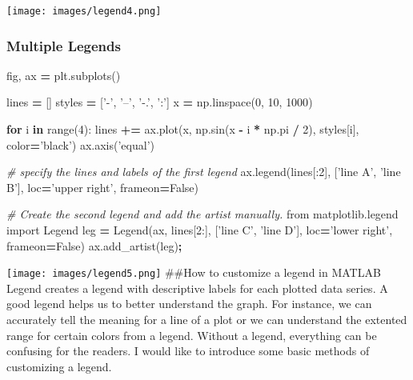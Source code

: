 \documentclass[]{book}
\newenvironment{Shaded}{\begin{snugshade}}{\end{snugshade}}
\newcommand{\BuiltInTok}[1]{#1}
\newcommand{\CommentTok}[1]{\textcolor[rgb]{0.56,0.35,0.01}{\textit{#1}}}
\newcommand{\ControlFlowTok}[1]{\textcolor[rgb]{0.13,0.29,0.53}{\textbf{#1}}}
\newcommand{\DecValTok}[1]{\textcolor[rgb]{0.00,0.00,0.81}{#1}}
\newcommand{\ImportTok}[1]{#1}
\newcommand{\KeywordTok}[1]{\textcolor[rgb]{0.13,0.29,0.53}{\textbf{#1}}}
\newcommand{\NormalTok}[1]{#1}
\newcommand{\OperatorTok}[1]{\textcolor[rgb]{0.81,0.36,0.00}{\textbf{#1}}}
\newcommand{\StringTok}[1]{\textcolor[rgb]{0.31,0.60,0.02}{#1}}
\newcommand{\VariableTok}[1]{\textcolor[rgb]{0.00,0.00,0.00}{#1}}
\begin{document}
\texttt{[image: images/legend4.png]}

\hypertarget{multiple-legends}{%
\subsubsection{Multiple Legends}\label{multiple-legends}}

\begin{Shaded}
\begin{Highlighting}[]
\NormalTok{fig, ax }\OperatorTok{=}\NormalTok{ plt.subplots()}

\NormalTok{lines }\OperatorTok{=}\NormalTok{ []}
\NormalTok{styles }\OperatorTok{=}\NormalTok{ [}\StringTok{'-'}\NormalTok{, }\StringTok{'--'}\NormalTok{, }\StringTok{'-.'}\NormalTok{, }\StringTok{':'}\NormalTok{]}
\NormalTok{x }\OperatorTok{=}\NormalTok{ np.linspace(}\DecValTok{0}\NormalTok{, }\DecValTok{10}\NormalTok{, }\DecValTok{1000}\NormalTok{)}

\ControlFlowTok{for}\NormalTok{ i }\KeywordTok{in} \BuiltInTok{range}\NormalTok{(}\DecValTok{4}\NormalTok{):}
\NormalTok{    lines }\OperatorTok{+=}\NormalTok{ ax.plot(x, np.sin(x }\OperatorTok{-}\NormalTok{ i }\OperatorTok{*}\NormalTok{ np.pi }\OperatorTok{/} \DecValTok{2}\NormalTok{),}
\NormalTok{                     styles[i], color}\OperatorTok{=}\StringTok{'black'}\NormalTok{)}
\NormalTok{ax.axis(}\StringTok{'equal'}\NormalTok{)}

\CommentTok{# specify the lines and labels of the first legend}
\NormalTok{ax.legend(lines[:}\DecValTok{2}\NormalTok{], [}\StringTok{'line A'}\NormalTok{, }\StringTok{'line B'}\NormalTok{],}
\NormalTok{          loc}\OperatorTok{=}\StringTok{'upper right'}\NormalTok{, frameon}\OperatorTok{=}\VariableTok{False}\NormalTok{)}

\CommentTok{# Create the second legend and add the artist manually.}
\ImportTok{from}\NormalTok{ matplotlib.legend }\ImportTok{import}\NormalTok{ Legend}
\NormalTok{leg }\OperatorTok{=}\NormalTok{ Legend(ax, lines[}\DecValTok{2}\NormalTok{:], [}\StringTok{'line C'}\NormalTok{, }\StringTok{'line D'}\NormalTok{],}
\NormalTok{             loc}\OperatorTok{=}\StringTok{'lower right'}\NormalTok{, frameon}\OperatorTok{=}\VariableTok{False}\NormalTok{)}
\NormalTok{ax.add_artist(leg)}\OperatorTok{;}
\end{Highlighting}
\end{Shaded}

\texttt{[image: images/legend5.png]}
\#\#How to customize a legend in MATLAB
Legend creates a legend with descriptive labels for each plotted data series. A good legend helps us to better understand the graph. For instance, we can accurately tell the meaning for a line of a plot or we can understand the extented range for certain colors from a legend. Without a legend, everything can be confusing for the readers.
I would like to introduce some basic methods of customizing a legend.
\end{document}
